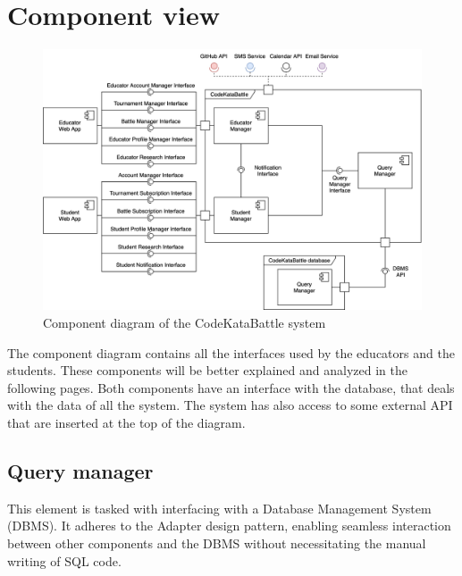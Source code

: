 \documentclass[12pt, a4paper]{report}
\begin{document}
    \section{Component view}
    \begin{figure}[H]
        \centering
        \includegraphics[width=1\linewidth]{images/component_view.png}
        \caption{Component diagram of the CodeKataBattle system}
    \end{figure}
    The component diagram contains all the interfaces used by the educators and the students. 
    These components will be better explained and analyzed in the following pages. 
    Both components have an interface with the database, that deals with the data of all the system. 
    The system has also access to some external API that are inserted at the top of the diagram.  

    \subsection{Query manager}
    This element is tasked with interfacing with a Database Management System (DBMS). 
    It adheres to the Adapter design pattern, enabling seamless interaction between other components and the DBMS without necessitating the manual writing of SQL code.
\end{document}

